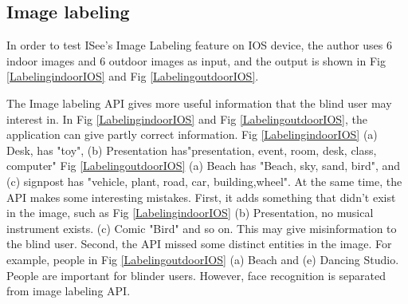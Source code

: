 \documentclass[11pt]{ucscthesis}
\begin{document}
\subsection{Image labeling}

In order to test ISee's Image Labeling feature on IOS device, the author uses 6 indoor images and 6 outdoor images as input, and the output is shown in Fig \ref{LabelingindoorIOS} and Fig \ref{LabelingoutdoorIOS}.
 
 The Image labeling API gives more useful information that the blind user may interest in. In Fig \ref{LabelingindoorIOS} and Fig \ref{LabelingoutdoorIOS}, the application can give partly correct information. Fig \ref{LabelingindoorIOS} (a) Desk, has "toy", (b) Presentation has"presentation, event, room, desk, class, computer" Fig \ref{LabelingoutdoorIOS} (a) Beach has "Beach, sky, sand, bird", and (c) signpost has "vehicle, plant, road, car, building,wheel". At the same time, the API makes some interesting mistakes. First, it adds something that didn't exist in the image, such as Fig \ref{LabelingindoorIOS} (b) Presentation, no musical instrument exists. (c) Comic "Bird"  and so on. This may give misinformation to the blind user. Second, the API missed some distinct entities in the image. For example, people in Fig \ref{LabelingoutdoorIOS} (a) Beach and (e) Dancing Studio. People are important for blinder users. However, face recognition is separated from image labeling API.
\end{document}

